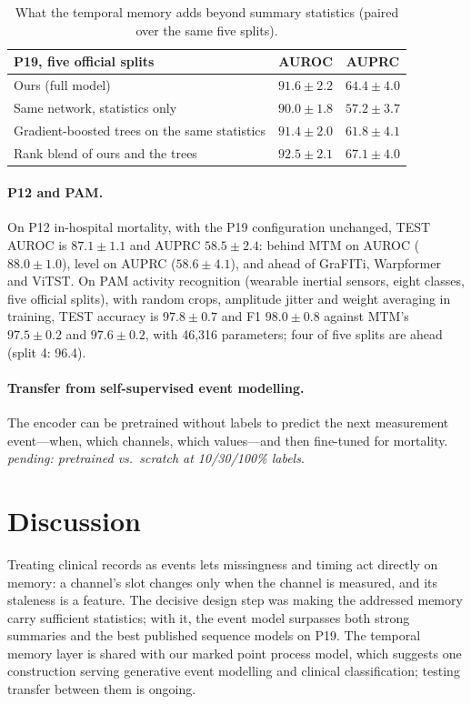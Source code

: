\documentclass[11pt]{article}
\newcommand{\pending}[1]{\textcolor{orange!70!black}{\emph{pending: #1}}}
\begin{document}
\begin{table}[h]
\centering\small
\begin{tabular}{lcc}
\toprule
P19, five official splits & AUROC & AUPRC \\
\midrule
Ours (full model) & $91.6 \pm 2.2$ & $64.4 \pm 4.0$ \\
Same network, statistics only & $90.0 \pm 1.8$ & $57.2 \pm 3.7$ \\
Gradient-boosted trees on the same statistics & $91.4 \pm 2.0$ & $61.8 \pm 4.1$ \\
Rank blend of ours and the trees & $92.5 \pm 2.1$ & $67.1 \pm 4.0$ \\
\bottomrule
\end{tabular}
\caption{What the temporal memory adds beyond summary statistics (paired over the same five splits).}
\label{tab:compl}
\end{table}

\paragraph{P12 and PAM.} On P12 in-hospital mortality, with the P19 configuration unchanged, TEST AUROC is $87.1 \pm 1.1$ and AUPRC $58.5 \pm 2.4$: behind MTM on AUROC ($88.0 \pm 1.0$), level on AUPRC ($58.6 \pm 4.1$), and ahead of GraFITi, Warpformer and ViTST. On PAM activity recognition (wearable inertial sensors, eight classes, five official splits), with random crops, amplitude jitter and weight averaging in training, TEST accuracy is $97.8 \pm 0.7$ and F1 $98.0 \pm 0.8$ against MTM's $97.5 \pm 0.2$ and $97.6 \pm 0.2$, with 46,316 parameters; four of five splits are ahead (split 4: 96.4).

\paragraph{Transfer from self-supervised event modelling.} The encoder can be pretrained without labels to predict the next measurement event---when, which channels, which values---and then fine-tuned for mortality. \pending{pretrained vs.\ scratch at 10/30/100\% labels}.

\section{Discussion}
Treating clinical records as events lets missingness and timing act directly on memory: a channel's slot changes only when the channel is measured, and its staleness is a feature. The decisive design step was making the addressed memory carry sufficient statistics; with it, the event model surpasses both strong summaries and the best published sequence models on P19. The temporal memory layer is shared with our marked point process model, which suggests one construction serving generative event modelling and clinical classification; testing transfer between them is ongoing.



\end{document}
